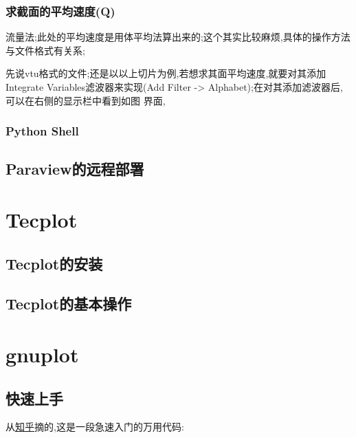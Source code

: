\subsubsection{求截面的平均速度(Q)}
流量法;此处的平均速度是用体平均法算出来的;这个其实比较麻烦,具体的操作方法与文件格式有关系;\par
先说vtu格式的文件;还是以以上切片为例,若想求其面平均速度,就要对其添加Integrate Variables滤波器来实现(Add Filter -> Alphabet);在对其添加滤波器后,可以在右侧的显示栏中看到如图 界面,


\subsubsection{Python Shell}


\subsection{Paraview的远程部署}


\section{Tecplot}

\subsection{Tecplot的安装}

\subsection{Tecplot的基本操作}



\section{gnuplot}

\subsection{快速上手}
从\href{https://zhuanlan.zhihu.com/p/356438078}{知乎}摘的,这是一段急速入门的万用代码:


